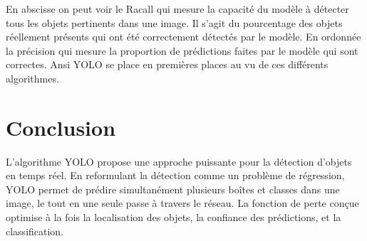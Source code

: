 \documentclass[a4paper,12pt]{article}
\begin{document}
En abscisse on peut voir le Racall qui mesure la capacité du modèle à détecter tous les objets pertinents dans une image. Il s'agit du pourcentage des objets réellement présents qui ont été correctement détectés par le modèle. 
En ordonnée la précision qui mesure la proportion de prédictions faites par le modèle qui sont correctes. 
Ansi YOLO se place en premières places au vu de ces différents algorithmes.

\section{Conclusion}

L'algorithme YOLO propose une approche puissante pour la détection d'objets en temps réel. En reformulant la détection comme un problème de régression, YOLO permet de prédire simultanément plusieurs boîtes et classes dans une image, le tout en une seule passe à travers le réseau. La fonction de perte conçue optimise à la fois la localisation des objets, la confiance des prédictions, et la classification.
\end{document}
